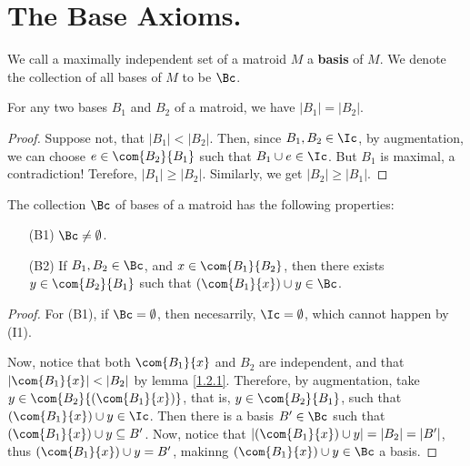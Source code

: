 
\section{The Base Axioms.}

\begin{definition}
    We call a maximally independent set of a matroid $M$ a \textbf{basis} of
    $M$.  We denote the collection of all bases of  $M$ to be  $\Bc$.
\end{definition}

\begin{lemma}\label{1.2.1}
    For any two bases $B_1$ and $B_2$ of a matroid, we have $|B_1|=|B_2|$.
\end{lemma}
\begin{proof}
    Suppose not, that $|B_1|<|B_2|$. Then, since $B_1,B_2 \in \Ic$, by
    augmentation, we can choose  $e \in \com{B_2}{B_1}$ such that $B_1 \cup e
    \in \Ic$. But $B_1$ is maximal, a contradiction! Terefore, $|B_1| \geq
    |B_2|$. Similarly, we get $|B_2| \geq |B_1|$.
\end{proof}

\begin{lemma}\label{1.2.2}
    The collection $\Bc$ of bases of a matroid has the following properties:
    \begin{enumerate}
        \item[(B1)] $\Bc \neq \emptyset$.

        \item[(B2)] If $B_1,B_2 \in \Bc$, and $x \in \com{B_1}{B_2}$, then
            there exists $y \in \com{B_2}{B_1}$ such that $(\com{B_1}{x}) \cup y
            \in \Bc$.
    \end{enumerate}
\end{lemma}
\begin{proof}
    For (B1), if $\Bc=\emptyset$, then necesarrily,  $\Ic=\emptyset$, which
    cannot happen by (I1).

    Now, notice that both $\com{{B_1}}{x}$ and $B_2$ are independent, and that
    $|\com{B_1}{x}|<|B_2|$ by lemma \ref{1.2.1}. Therefore, by augmentation,
    take $y \in \com{B_2}{(\com{B_1}{x})}$, that is, $y \in \com{B_2}{B_1}$,
    such that $(\com{B_1}{x}) \cup y \in \Ic$. Then there is a basis $B' \in
    \Bc$ such that  $(\com{B_1}{x}) \cup y \subseteq B'$. Now, notice that
    $|(\com{B_1}{x}) \cup y|=|B_2|=|B'|$, thus $(\com{B_1}{x}) \cup y=B'$,
    makinng $(\com{B_1}{x}) \cup y \in \Bc$ a basis.
\end{proof}

